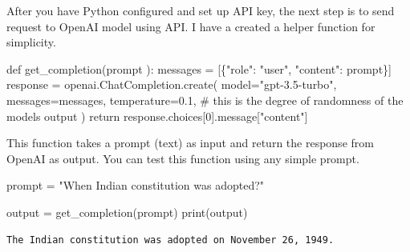 \documentclass[
  letterpaper,
  DIV=11,
  numbers=noendperiod]{scrreprt}
\newenvironment{Shaded}{\begin{snugshade}}{\end{snugshade}}
\newcommand{\BuiltInTok}[1]{\textcolor[rgb]{0.00,0.23,0.31}{#1}}
\newcommand{\CommentTok}[1]{\textcolor[rgb]{0.37,0.37,0.37}{#1}}
\newcommand{\ControlFlowTok}[1]{\textcolor[rgb]{0.00,0.23,0.31}{#1}}
\newcommand{\DecValTok}[1]{\textcolor[rgb]{0.68,0.00,0.00}{#1}}
\newcommand{\FloatTok}[1]{\textcolor[rgb]{0.68,0.00,0.00}{#1}}
\newcommand{\KeywordTok}[1]{\textcolor[rgb]{0.00,0.23,0.31}{#1}}
\newcommand{\NormalTok}[1]{\textcolor[rgb]{0.00,0.23,0.31}{#1}}
\newcommand{\OperatorTok}[1]{\textcolor[rgb]{0.37,0.37,0.37}{#1}}
\newcommand{\StringTok}[1]{\textcolor[rgb]{0.13,0.47,0.30}{#1}}
\begin{document}
After you have Python configured and set up API key, the next step is to
send request to OpenAI model using API. I have a created a helper
function for simplicity.

\begin{Shaded}
\begin{Highlighting}[]
\KeywordTok{def}\NormalTok{ get\_completion(prompt ):}
\NormalTok{    messages }\OperatorTok{=}\NormalTok{ [\{}\StringTok{"role"}\NormalTok{: }\StringTok{"user"}\NormalTok{, }\StringTok{"content"}\NormalTok{: prompt\}]}
\NormalTok{    response }\OperatorTok{=}\NormalTok{ openai.ChatCompletion.create(}
\NormalTok{        model}\OperatorTok{=}\StringTok{"gpt{-}3.5{-}turbo"}\NormalTok{,}
\NormalTok{        messages}\OperatorTok{=}\NormalTok{messages,}
\NormalTok{        temperature}\OperatorTok{=}\FloatTok{0.1}\NormalTok{, }\CommentTok{\# this is the degree of randomness of the model\textquotesingle{}s output}
\NormalTok{    )}
    \ControlFlowTok{return}\NormalTok{ response.choices[}\DecValTok{0}\NormalTok{].message[}\StringTok{"content"}\NormalTok{]}
\end{Highlighting}
\end{Shaded}

This function takes a prompt (text) as input and return the response
from OpenAI as output. You can test this function using any simple
prompt.

\begin{Shaded}
\begin{Highlighting}[]
\NormalTok{prompt }\OperatorTok{=} \StringTok{"When Indian constitution was adopted?"}

\NormalTok{output }\OperatorTok{=}\NormalTok{ get\_completion(prompt)}
\BuiltInTok{print}\NormalTok{(output)}
\end{Highlighting}
\end{Shaded}

\begin{tcolorbox}[enhanced jigsaw, left=2mm, colframe=quarto-callout-note-color-frame, toptitle=1mm, title={Output}, colback=white, breakable, coltitle=black, opacitybacktitle=0.6, bottomtitle=1mm, titlerule=0mm, arc=.35mm, opacityback=0, toprule=.15mm, rightrule=.15mm, colbacktitle=quarto-callout-note-color!10!white, leftrule=.75mm, bottomrule=.15mm]

\begin{verbatim}
The Indian constitution was adopted on November 26, 1949.
\end{verbatim}

\end{tcolorbox}
\end{document}
